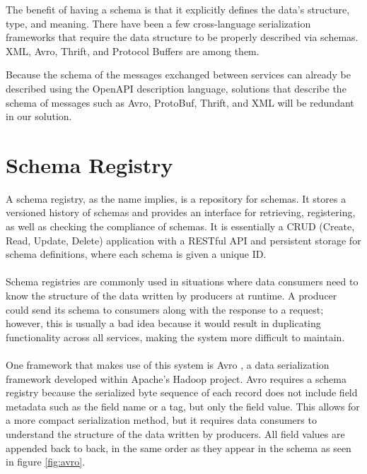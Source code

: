 The benefit of having a schema is that it explicitly defines the data's structure, type, and meaning.
There have been a few cross-language serialization frameworks that require the data structure to be properly described via schemas.
XML, Avro, Thrift, and Protocol Buffers \cite{8,9,10} are among them.

Because the schema of the messages exchanged between services can already be described using the OpenAPI description language,
solutions that describe the schema of messages such as Avro, ProtoBuf, Thrift, and XML will be redundant in our solution.

\section{Schema Registry} %
\label{sec:schema_registry}

A schema registry, as the name implies, is a repository for schemas.
It stores a versioned history of schemas and provides an interface for retrieving, registering, as well as checking the compliance of schemas.
It is essentially a CRUD (Create, Read, Update, Delete) application with a RESTful API and persistent storage for schema definitions, where each schema is given a unique ID.

\paragraph{}

Schema registries are commonly used in situations where data consumers need to know the structure of the data written by producers at runtime.
A producer could send its schema to consumers along with the response to a request;
however, this is usually a bad idea because it would result in duplicating functionality across all services, making the system more difficult to maintain.

\paragraph{}

One framework that makes use of this system is Avro \cite{8}, a data serialization framework developed within Apache's Hadoop project.
Avro requires a schema registry because the serialized byte sequence of each record does not include field metadata such as the field name or a tag, but only the field value.
This allows for a more compact serialization method, but it requires data consumers to understand the structure of the data written by producers.
All field values are appended back to back, in the same order as they appear in the schema as seen in figure \ref{fig:avro}.

